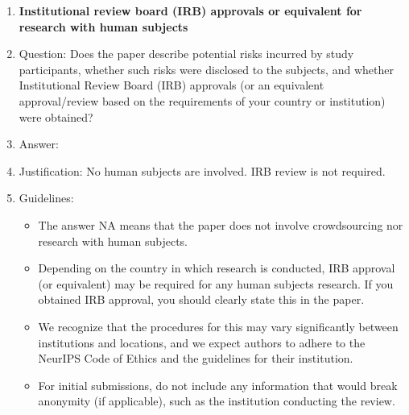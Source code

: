 \documentclass{article}
\theoremstyle{definition}
\begin{document}
\begin{enumerate}
\item {\bf Institutional review board (IRB) approvals or equivalent for research with human subjects}
    \item[] Question: Does the paper describe potential risks incurred by study participants, whether such risks were disclosed to the subjects, and whether Institutional Review Board (IRB) approvals (or an equivalent approval/review based on the requirements of your country or institution) were obtained?
    \item[] Answer: \answerNA{}
    \item[] Justification: No human subjects are involved. IRB review is not required.
    \item[] Guidelines:
    \begin{itemize}
        \item The answer NA means that the paper does not involve crowdsourcing nor research with human subjects.
        \item Depending on the country in which research is conducted, IRB approval (or equivalent) may be required for any human subjects research. If you obtained IRB approval, you should clearly state this in the paper. 
        \item We recognize that the procedures for this may vary significantly between institutions and locations, and we expect authors to adhere to the NeurIPS Code of Ethics and the guidelines for their institution. 
        \item For initial submissions, do not include any information that would break anonymity (if applicable), such as the institution conducting the review.
    \end{itemize}


\end{enumerate}
\end{document}
